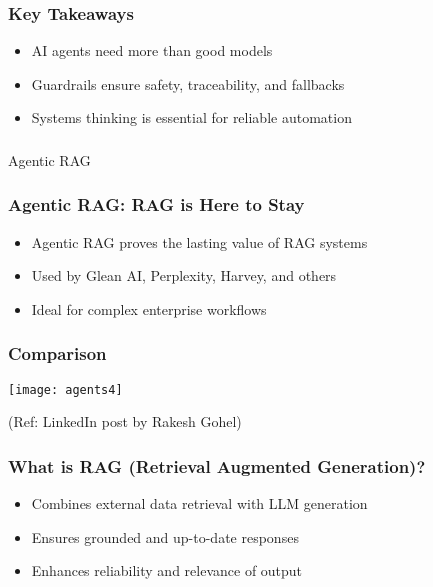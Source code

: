 \begin{frame}[fragile]\frametitle{Key Takeaways}
    \begin{itemize}
        \item AI agents need more than good models
        \item Guardrails ensure safety, traceability, and fallbacks
        \item Systems thinking is essential for reliable automation
    \end{itemize}
\end{frame}

\begin{frame}[fragile]\frametitle{}
\begin{center}
{\Large Agentic RAG}
\end{center}
\end{frame}

\begin{frame}[fragile]\frametitle{Agentic RAG: RAG is Here to Stay}
    \begin{itemize}
        \item Agentic RAG proves the lasting value of RAG systems
        \item Used by Glean AI, Perplexity, Harvey, and others
        \item Ideal for complex enterprise workflows
    \end{itemize}
\end{frame}

\begin{frame}[fragile]\frametitle{Comparison}
	
	\begin{center}
	\texttt{[image: agents4]}
	\end{center}
	
{\tiny (Ref: LinkedIn post by Rakesh Gohel)}

\end{frame}


\begin{frame}[fragile]\frametitle{What is RAG (Retrieval Augmented Generation)?}
    \begin{itemize}
        \item Combines external data retrieval with LLM generation
        \item Ensures grounded and up-to-date responses
        \item Enhances reliability and relevance of output
    \end{itemize}
\end{frame}

